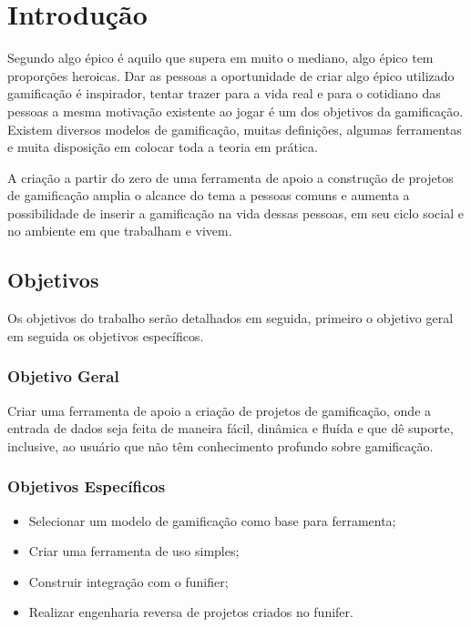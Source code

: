 \chapter[Introdução]{Introdução}


Segundo \cite{mcgonigal2011reality} algo épico é aquilo que supera em muito o mediano, algo épico tem proporções heroicas. Dar as pessoas a oportunidade de criar algo épico utilizado gamificação é inspirador, tentar trazer para a vida real e para o cotidiano das pessoas a mesma motivação existente ao jogar é um dos objetivos da gamificação. Existem diversos modelos de gamificação, muitas definições, algumas ferramentas e muita disposição em colocar toda a teoria em prática. 

A criação a partir do zero de uma ferramenta de apoio a construção de projetos de gamificação amplia o alcance do tema a pessoas comuns e aumenta a possibilidade de inserir a gamificação na vida dessas pessoas, em seu ciclo social e no ambiente em que trabalham e vivem.


\section{Objetivos}

Os objetivos do trabalho serão detalhados em seguida, primeiro o objetivo geral em seguida os objetivos específicos.


\subsection{Objetivo Geral}

Criar uma ferramenta de apoio a criação de projetos de gamificação, onde a entrada de dados seja feita de maneira fácil, dinâmica e fluída e que dê suporte, inclusive, ao usuário que não têm conhecimento profundo sobre gamificação.

\subsection{Objetivos Específicos}

\begin{itemize}

\item  Selecionar um modelo de gamificação como base para ferramenta;
\item  Criar uma ferramenta de uso simples;
\item  Construir integração com o funifier;
\item  Realizar engenharia reversa de projetos criados no funifer.


\end{itemize}

